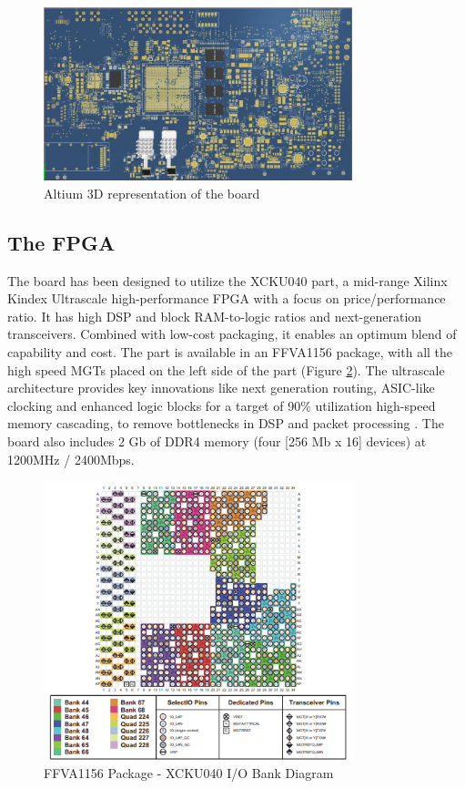 \documentclass[a4paper]{PoS}
\begin{document}
\begin{figure}[h]
\centering
\includegraphics[width=0.8\textwidth]{board_3D_altium.png}
\caption{Altium 3D representation of the board}
\label{fig1}
\end{figure}



\subsection{The FPGA}
The board has been designed to utilize the XCKU040 part, a  mid-range Xilinx Kindex Ultrascale high-performance FPGA with a focus on price/performance ratio. It has high DSP and block RAM-to-logic ratios and next-generation transceivers. Combined with low-cost packaging, it enables an optimum blend of capability and cost. The part is available in an FFVA1156 package, with all the high speed MGTs  placed on the left side of the part (Figure \ref{xcku040}). The ultrascale architecture provides key innovations like next generation routing, ASIC-like clocking and enhanced logic blocks for a target of 90\% utilization high-speed memory cascading, to remove bottlenecks in DSP and packet processing \cite{mehta2013xilinx}.
The board also includes 2 Gb of DDR4 memory (four [256 Mb x 16] devices) at 1200MHz / 2400Mbps.

\begin{figure}[h]
\centering
\includegraphics[width=0.8\textwidth]{xcku040_pinout.png}
\caption{FFVA1156 Package - XCKU040 I/O Bank Diagram}
\label{xcku040}
\end{figure}
\end{document}
